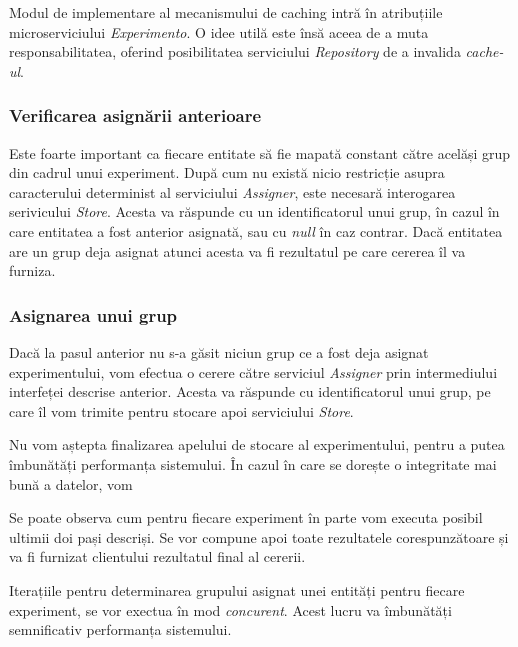 \begin{remark}
	Modul de implementare al mecanismului de caching intră în atribuțiile microserviciului \textit{Experimento}. O idee utilă este însă aceea de a muta responsabilitatea, oferind posibilitatea serviciului \textit{Repository} de a invalida \textit{cache-ul}.
\end{remark} 

\subsubsection{Verificarea asignării anterioare}

Este foarte important ca fiecare entitate să fie mapată constant către acelăși grup din cadrul unui experiment. După cum nu există nicio restricție asupra caracterului determinist al serviciului \textit{Assigner}, este necesară interogarea serivicului \textit{Store}. Acesta va răspunde cu un identificatorul unui grup, în cazul în care entitatea a fost anterior asignată, sau cu \textit{null} în caz contrar. 
Dacă entitatea are un grup deja asignat atunci acesta va fi rezultatul pe care cererea îl va furniza. 

\subsubsection{Asignarea unui grup}

Dacă la pasul anterior nu s-a găsit niciun grup ce a fost deja asignat experimentului, vom efectua o cerere către serviciul \textit{Assigner} prin intermediului interfeței descrise anterior. Acesta va răspunde cu identificatorul unui grup, pe care îl vom trimite pentru stocare apoi serviciului \textit{Store}. 

\begin{remark}
	Nu vom aștepta finalizarea apelului de stocare al experimentului, pentru a putea îmbunătăți performanța sistemului. În cazul în care se dorește o integritate mai bună a datelor, vom 
\end{remark}

Se poate observa cum pentru fiecare experiment în parte vom executa posibil ultimii doi pași descriși. Se vor compune apoi toate rezultatele corespunzătoare și va fi furnizat clientului rezultatul final al cererii.

\begin{remark}
	Iterațiile pentru determinarea grupului asignat unei entități pentru fiecare experiment, se vor exectua în mod \textit{concurent}. Acest lucru va îmbunătăți semnificativ performanța sistemului.
\end{remark}

